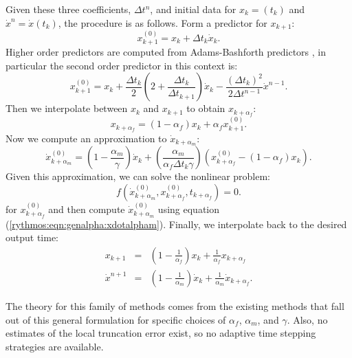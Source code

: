 \documentclass[pdf,ps2pdf,11pt]{SANDreport}
\begin{document}
Given these three coefficients, $\Delta t^n$, and initial data for $x_k=(t_k)$
and $\dot{x}^n=\dot{x}(t_k)$, the procedure is as follows.  Form a predictor
for $x_{k+1}$:
%
\begin{equation} \label{rythmos:eqn:genalpha:predictor1}
x_{k+1}^{(0)} = x_k + \Delta t_k\dot{x}_k.
\end{equation}
%
Higher order predictors are computed from Adams-Bashforth predictors
\cite{AdamsBashforth}, in particular the second order predictor in this
context is:
%
\begin{equation} \label{rythmos:eqn:genalpha:predictor2}
x_{k+1}^{(0)} = x_k + \frac{\Delta t_k}{2}\left(2+\frac{\Delta t_k}{\Delta t_{k+1}}\right)\dot{x}_k
  - \frac{(\Delta t_k)^2}{2\Delta t^{n-1}}\dot{x}^{n-1}.
\end{equation}
%
Then we interpolate between $x_k$ and $x_{k+1}$ to obtain $x_{k+\alpha_f}$:
%
\begin{equation}\label{rythmos:eqn:genalpha:xalphaf}
x_{k+\alpha_f} = (1-\alpha_f)x_k + \alpha_f x_{k+1}^{(0)}.
\end{equation}
%
Now we compute an approximation to $\dot{x}_{k+\alpha_m}$:
%
\begin{equation}\label{rythmos:eqn:genalpha:xdotalpham}
\dot{x}_{k+\alpha_m}^{(0)} = \left(1-\frac{\alpha_m}{\gamma}\right)\dot{x}_k
+ \left(\frac{\alpha_m}{\alpha_f\Delta t_k\gamma}\right)
\left(x_{k+\alpha_f}^{(0)} - (1-\alpha_f)x_k\right).
\end{equation}
%
Given this approximation, we can solve the nonlinear problem:
%
\begin{equation}\label{rythmos:eqn:genalpha:nonlinear}
f(\dot{x}_{k+\alpha_m}^{(0)},x_{k+\alpha_f}^{(0)},t_{k+\alpha_f}) = 0.
\end{equation}
%
for $x_{k+\alpha_f}^{(0)}$ and then compute $\dot{x}_{k+\alpha_m}^{(0)}$ using
equation (\ref{rythmos:eqn:genalpha:xdotalpham}).  Finally, we interpolate
back to the desired output time:
%
\begin{eqnarray}\label{rythmos:eqn:genalpha:interp}
x_{k+1} & = & \left(1-\frac{1}{\alpha_f}\right)x_k + \frac{1}{\alpha_f}x_{k+\alpha_f} \\
\dot{x}^{n+1} & = & \left(1-\frac{1}{\alpha_m}\right)\dot{x}_k + \frac{1}{\alpha_m}\dot{x}_{k+\alpha_f}.
\end{eqnarray}

The theory for this family of methods comes from the existing methods that fall
out of this general formulation for specific choices of $\alpha_f$, $\alpha_m$,
and $\gamma$.  Also, no estimates of the local truncation error exist, so no
adaptive time stepping strategies are available.  
\end{document}
